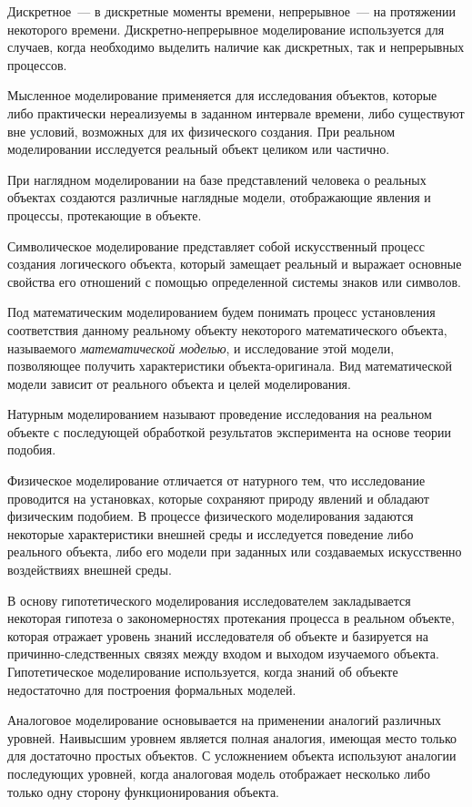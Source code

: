 Дискретное~--- в дискретные моменты времени, непрерывное~--- на протяжении некоторого времени. Дискретно-непрерывное моделирование используется для случаев, когда необходимо выделить наличие как дискретных, так и непрерывных процессов.

Мысленное моделирование применяется для исследования объектов, которые либо практически нереализуемы в заданном интервале времени, либо существуют вне условий, возможных для их физического создания. При реальном моделировании исследуется реальный объект целиком или частично.

При наглядном моделировании на базе представлений человека о реальных объектах создаются различные наглядные модели, отображающие явления и процессы, протекающие в объекте.

Символическое моделирование представляет собой искусственный процесс создания логического объекта, который замещает реальный и выражает основные свойства его отношений с помощью определенной системы знаков или символов.

Под математическим моделированием будем понимать процесс установления соответствия данному реальному объекту некоторого математического объекта, называемого \textit{математической моделью}, и исследование этой модели, позволяющее получить характеристики объекта-оригинала. Вид математической модели зависит от реального объекта и целей моделирования.

Натурным моделированием называют проведение исследования на реальном объекте с последующей обработкой результатов эксперимента на основе теории подобия.

Физическое моделирование отличается от натурного тем, что исследование проводится на установках, которые сохраняют природу явлений и обладают физическим подобием. В процессе физического моделирования задаются некоторые характеристики внешней среды и исследуется поведение либо реального объекта, либо его модели при заданных или создаваемых искусственно воздействиях внешней среды.

В основу гипотетического моделирования исследователем закладывается некоторая гипотеза о закономерностях протекания процесса в реальном объекте, которая отражает уровень знаний исследователя об объекте и базируется на причинно-следственных связях между входом и выходом изучаемого объекта. Гипотетическое моделирование используется, когда знаний об объекте недостаточно для построения формальных моделей.

Аналоговое моделирование основывается на применении аналогий различных уровней. Наивысшим уровнем является полная аналогия, имеющая место только для достаточно простых объектов. С усложнением объекта используют аналогии последующих уровней, когда аналоговая модель отображает несколько либо только одну сторону функционирования объекта.

